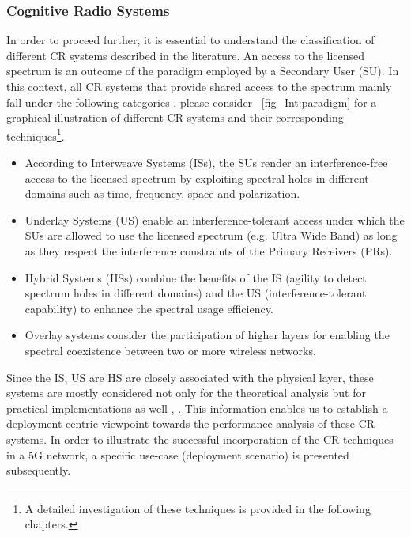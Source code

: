 \subsubsection*{Cognitive Radio Systems}


In order to proceed further, it is essential to understand the classification of different CR systems described in the literature. An access to the licensed spectrum is an outcome of the paradigm employed by a Secondary User (SU). In this context, all CR systems that provide shared access to the spectrum mainly fall under the following categories \cite{Goldsmith09}, please consider \figurename~\ref{fig_Int:paradigm} for a graphical illustration of different CR systems and their corresponding techniques\footnote{A detailed investigation of these techniques is provided in the following chapters.}. 
\begin{itemize}
\item According to Interweave Systems (ISs), the SUs render an interference-free access to the licensed spectrum by exploiting spectral holes in different domains such as time, frequency, space and polarization. 
\item Underlay Systems (US) enable an interference-tolerant access under which the SUs are allowed to use the licensed spectrum (e.g. Ultra Wide Band) as long as they respect the interference constraints of the Primary Receivers (PRs). 
\item Hybrid Systems (HSs) combine the benefits of the IS (agility to detect spectrum holes in different domains) and the US (interference-tolerant capability) to enhance the spectral usage efficiency.  
\item Overlay systems consider the participation of higher layers for enabling the spectral coexistence between two or more wireless networks. 
\end{itemize}
Since the IS, US are HS are closely associated with the physical layer, these systems are mostly considered not only for the theoretical analysis but for practical implementations as-well , \cite{Cabric04, Cabric06, Kim10}. 
This information enables us to establish a deployment-centric viewpoint towards the performance analysis of these CR systems. In order to illustrate the successful incorporation of the CR techniques in a 5G network, a specific use-case (deployment scenario) is presented subsequently. 


